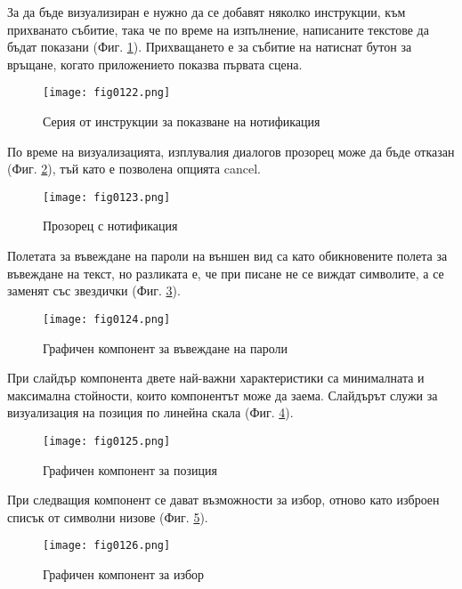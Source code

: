 За да бъде визуализиран е нужно да се добавят няколко инструкции, към прихванато събитие, така че по време на изпълнение, написаните текстове да бъдат показани (Фиг. \ref{fig0122}). Прихващането е за събитие на натиснат бутон за връщане, когато приложението показва първата сцена. 

\begin{figure}[H]
  \centering
  \texttt{[image: fig0122.png]}
  \caption{Серия от инструкции за показване на нотификация}
\label{fig0122}
\end{figure}

По време на визуализацията, изплувалия диалогов прозорец може да бъде отказан (Фиг. \ref{fig0123}), тъй като е позволена опцията cancel.

\begin{figure}[H]
  \centering
  \texttt{[image: fig0123.png]}
  \caption{Прозорец с нотификация}
\label{fig0123}
\end{figure}

Полетата за въвеждане на пароли на външен вид са като обикновените полета за въвеждане на текст, но разликата е, че при писане не се виждат символите, а се заменят със звездички (Фиг. \ref{fig0124}).

\begin{figure}[H]
  \centering
  \texttt{[image: fig0124.png]}
  \caption{Графичен компонент за въвеждане на пароли}
\label{fig0124}
\end{figure}

При слайдър компонента двете най-важни характеристики са минималната и максимална стойности, които компонентът може да заема. Слайдърът служи за визуализация на позиция по линейна скала (Фиг. \ref{fig0125}).

\begin{figure}[H]
  \centering
  \texttt{[image: fig0125.png]}
  \caption{Графичен компонент за позиция}
\label{fig0125}
\end{figure}

При следващия компонент се дават възможности за избор, отново като изброен списък от символни низове (Фиг. \ref{fig0126}).

\begin{figure}[H]
  \centering
  \texttt{[image: fig0126.png]}
  \caption{Графичен компонент за избор}
\label{fig0126}
\end{figure}

